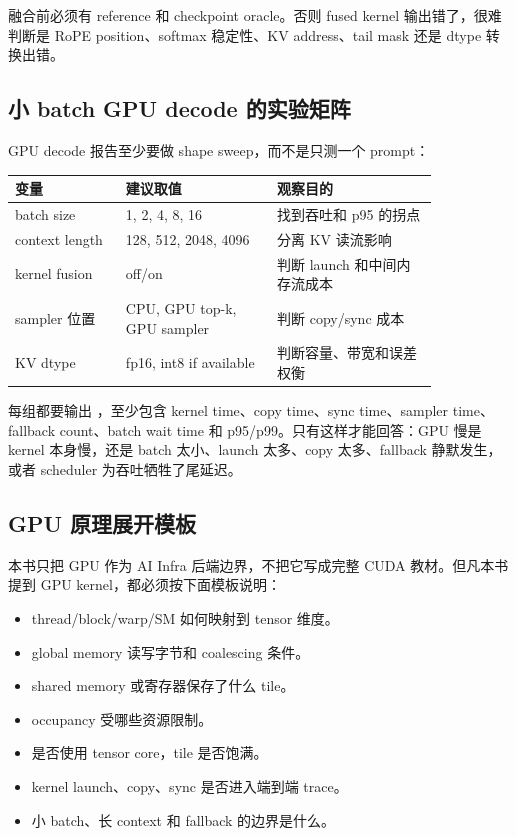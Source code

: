 融合前必须有 reference 和 checkpoint oracle。否则 fused kernel 输出错了，很难判断是 RoPE position、softmax 稳定性、KV address、tail mask 还是 dtype 转换出错。

\subsection{小 batch GPU decode 的实验矩阵}

GPU decode 报告至少要做 shape sweep，而不是只测一个 prompt：

\begin{center}
\begin{tabular}{p{0.22\linewidth}p{0.30\linewidth}p{0.32\linewidth}}
\toprule
变量 & 建议取值 & 观察目的 \\
\midrule
batch size & 1, 2, 4, 8, 16 & 找到吞吐和 p95 的拐点 \\
context length & 128, 512, 2048, 4096 & 分离 KV 读流影响 \\
kernel fusion & off/on & 判断 launch 和中间内存流成本 \\
sampler 位置 & CPU, GPU top-k, GPU sampler & 判断 copy/sync 成本 \\
KV dtype & fp16, int8 if available & 判断容量、带宽和误差权衡 \\
\bottomrule
\end{tabular}
\end{center}

每组都要输出 ，至少包含 kernel time、copy time、sync time、sampler time、fallback count、batch wait time 和 p95/p99。只有这样才能回答：GPU 慢是 kernel 本身慢，还是 batch 太小、launch 太多、copy 太多、fallback 静默发生，或者 scheduler 为吞吐牺牲了尾延迟。

\subsection{GPU 原理展开模板}

本书只把 GPU 作为 AI Infra 后端边界，不把它写成完整 CUDA 教材。但凡本书提到 GPU kernel，都必须按下面模板说明：

\begin{itemize}
  \item thread/block/warp/SM 如何映射到 tensor 维度。
  \item global memory 读写字节和 coalescing 条件。
  \item shared memory 或寄存器保存了什么 tile。
  \item occupancy 受哪些资源限制。
  \item 是否使用 tensor core，tile 是否饱满。
  \item kernel launch、copy、sync 是否进入端到端 trace。
  \item 小 batch、长 context 和 fallback 的边界是什么。
\end{itemize}

